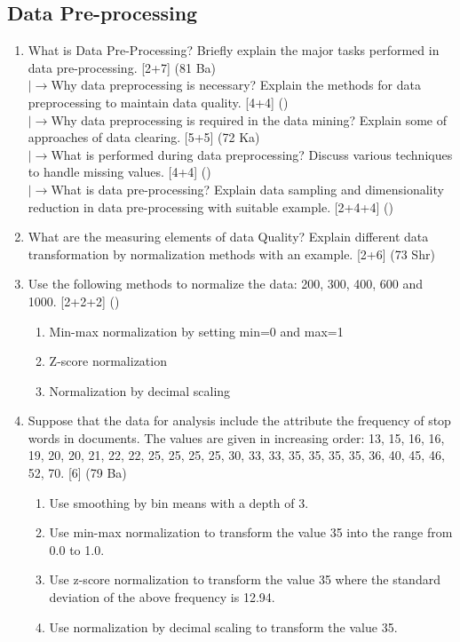 \documentclass[12pt]{article}
\newcommand{\lb}{\\$\left|\rightarrow\right.$}
\begin{document}
  \subsection{Data Pre-processing}
    \begin{enumerate}[topsep=0pt, noitemsep]
      \item What is Data Pre-Processing? Briefly explain the major tasks performed in data pre-processing. \hfill [2+7] (81 Ba)
        \lb Why data preprocessing is necessary? Explain the methods for data preprocessing to maintain data quality. \hfill [4+4] ()
        \lb Why data preprocessing is required in the data mining? Explain some of approaches of data clearing. \hfill [5+5] (72 Ka)
        \lb What is performed during data preprocessing? Discuss various techniques to handle missing values. \hfill [4+4] ()
        \lb What is data pre-processing? Explain data sampling and dimensionality reduction in data pre-processing with suitable example. \hfill [2+4+4] ()

      \item What are the measuring elements of data Quality? Explain different data transformation by normalization methods with an example. \hfill [2+6] (73 Shr)

      \item Use the following methods to normalize the data: 200, 300, 400, 600 and 1000. \hfill [2+2+2] ()
        \begin{enumerate}[label=\alph*),topsep=0pt,noitemsep]
          \item Min-max normalization by setting min=0 and max=1
          \item Z-score normalization
          \item Normalization by decimal scaling
        \end{enumerate}

      \item Suppose that the data for analysis include the attribute the frequency of stop words in documents. The values are given in increasing order: 13, 15, 16, 16, 19, 20, 20, 21, 22, 22, 25, 25, 25, 25, 30, 33, 33, 35, 35, 35, 35, 36, 40, 45, 46, 52, 70. \hfill [6] (79 Ba)
        \begin{enumerate}[label=\alph*),topsep=2pt,noitemsep]
          \item Use smoothing by bin means with a depth of 3.
          \item Use min-max normalization to transform the value 35 into the range from 0.0 to 1.0.
          \item Use z-score normalization to transform the value 35 where the standard deviation of the above frequency is 12.94.
          \item Use normalization by decimal scaling to transform the value 35.
        \end{enumerate}


\end{enumerate}
\end{document}
